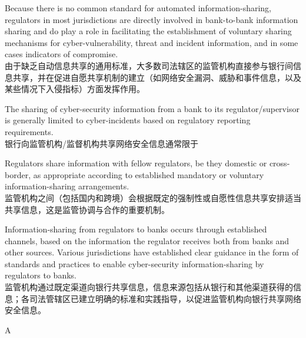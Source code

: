 \documentclass{article}
\begin{document}
\begin{choices}
    \item Because there is no common standard for automated information-sharing, regulators in most jurisdictions are directly involved in bank-to-bank information sharing and do play a role in facilitating the establishment of voluntary sharing mechanisms for cyber-vulnerability, threat and incident information, and in some cases indicators of compromise.\\
    由于缺乏自动信息共享的通用标准，大多数司法辖区的监管机构直接参与银行间信息共享，并在促进自愿共享机制的建立（如网络安全漏洞、威胁和事件信息，以及某些情况下入侵指标）方面发挥作用。
    \item The sharing of cyber-security information from a bank to its regulator/supervisor is generally limited to cyber-incidents based on regulatory reporting requirements.\\
    银行向监管机构/监督机构共享网络安全信息通常限于
    \item Regulators share information with fellow regulators, be they domestic or cross-border, as appropriate according to established mandatory or voluntary information-sharing arrangements.\\
    监管机构之间（包括国内和跨境）会根据既定的强制性或自愿性信息共享安排适当共享信息，这是监管协调与合作的重要机制。
    \item Information-sharing from regulators to banks occurs through established channels, based on the information the regulator receives both from banks and other sources. Various jurisdictions have established clear guidance in the form of standards and practices to enable cyber-security information-sharing by regulators to banks.\\
    监管机构通过既定渠道向银行共享信息，信息来源包括从银行和其他渠道获得的信息；各司法管辖区已建立明确的标准和实践指导，以促进监管机构向银行共享网络安全信息。
\end{choices}

\begin{correctanswer}
    A
\end{correctanswer}
\end{document}
